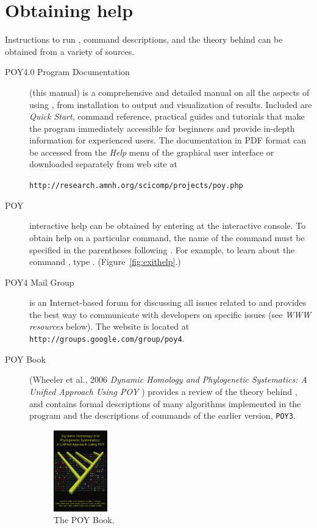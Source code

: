 \section{Obtaining help} \label{sec:help}
Instructions to run \poy, command descriptions, and the theory behind \poy can be obtained from a variety of sources.
\begin{description}
\item[POY4.0 Program Documentation] (this manual) is a comprehensive and detailed manual on all the aspects of using \poy, from installation to output and visualization of results. Included are \emph{Quick Start}, \poy command reference, practical guides and tutorials that make the program immediately accessible for beginners and provide in-depth information for experienced users. The documentation in PDF format can be accessed from the \emph{Help} menu of the graphical user interface or downloaded separately from \poy web site at
\begin{center}
\texttt{http://research.amnh.org/scicomp/projects/poy.php}
\end{center}
\item[POY] interactive help can be obtained by entering  at the \poy interactive console. To obtain help on a particular command, the name of the command must be specified in the parentheses following . For example, to learn about the command , type . (Figure~\ref{fig:exithelp}.)
\item[POY4 Mail Group] is an Internet-based forum for discussing all issues related to \poy and provides the best way to communicate with \poy developers on specific issues (see \emph{WWW resources} below). The website is located at \texttt{http://groups.google.com/group/poy4}.
\item[POY Book] (Wheeler et al., 2006 \emph{Dynamic Homology and Phylogenetic Systematics: A Unified Approach Using POY \cite{wheeleretal2006}}) provides a review of the theory behind \poy, and contains formal descriptions of many algorithms implemented in the program and the descriptions of commands of the earlier version, \texttt{POY3}.
\begin{figure}[htbp]
   \centering
   \includegraphics[width=0.23\textwidth]{doc/figures/figpoybook.jpg}
   \caption{The POY Book.}
   \label{fig:figprocess}
\end{figure}
\end{description}

